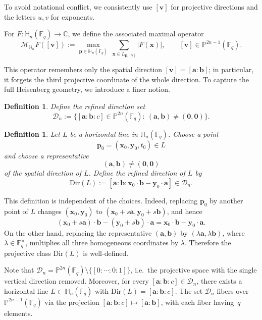 \documentclass[11pt]{article}
\newtheorem{definition}[theorem]{Definition}
\newcommand{\1}{\mathbf 1}
\begin{document}
To avoid notational conflict, we consistently use $[\mathbf{v}]$ for projective directions and the letters
$u,v$ for exponents.

\smallskip

For $F:\mathbb{H}_n(\mathbb{F}_q)\to\mathbb{C}$, we define the associated maximal operator
\[
\mathcal{M}_{\mathbb{H}_n}F([\mathbf{v}])
:=
\max_{\mathbf{p}\in\mathbb{H}_n(\mathbb{F}_q)}\ \sum_{\mathbf x\in L_{\mathbf{p}, [\mathbf{v}]}} |F(\mathbf x)|,
\qquad
[\mathbf{v}]\in \mathbb{P}^{2n-1}(\mathbb{F}_q).
\]

This operator remembers only the spatial direction $[\mathbf{v}]=[\mathbf{a}:\mathbf{b}]$; in particular, it forgets the third projective coordinate of the whole direction. To capture the full Heisenberg geometry, we introduce a finer notion.



{ 
\begin{definition}\label{def:refined-dir-set}
Define the refined direction set
\[
\mathcal D_n
:=
\bigl\{[\mathbf a:\mathbf b:c]\in\mathbb P^{2n}(\mathbb F_q):\ (\mathbf a,\mathbf b)\neq(\mathbf 0,\mathbf 0)\bigr\}.
\]
\end{definition}

\begin{definition}\label{def:refined-direction}
Let \(L\) be a horizontal line in \(\mathbb H_n(\mathbb F_q)\). Choose a point
\[
\mathbf p_0=(\mathbf x_0,\mathbf y_0,t_0)\in L
\]
and choose a representative
\[
(\mathbf a,\mathbf b)\neq(\mathbf 0,\mathbf 0)
\]
of the spatial direction of \(L\). Define the refined direction of \(L\) by
\[
\mathrm{Dir}(L)
:=
[\mathbf a:\mathbf b:\mathbf x_0\cdot\mathbf b-\mathbf y_0\cdot\mathbf a]
\in \mathcal D_n.
\]
\end{definition}
This definition is independent of the choices. Indeed, replacing \(\mathbf p_0\) by another point of \(L\) changes
\((\mathbf x_0,\mathbf y_0)\) to \((\mathbf x_0+s\mathbf a,\mathbf y_0+s\mathbf b)\), and hence
\[
(\mathbf x_0+s\mathbf a)\cdot\mathbf b-(\mathbf y_0+s\mathbf b)\cdot\mathbf a
=
\mathbf x_0\cdot\mathbf b-\mathbf y_0\cdot\mathbf a.
\]
On the other hand, replacing the representative \((\mathbf a,\mathbf b)\) by \((\lambda\mathbf a,\lambda\mathbf b)\), where \(\lambda\in\mathbb F_q^\times\), multiplies all three homogeneous coordinates by \(\lambda\). Therefore the projective class \(\mathrm{Dir}(L)\) is well-defined.
}

Note that \(\mathcal D_n=\mathbb P^{2n}(\mathbb F_q)\setminus\{[0:\cdots:0:1]\}\), i.e.\ the projective space with the single vertical direction removed.
Moreover, for every \([\mathbf a:\mathbf b:c]\in\mathcal D_n\), there exists a horizontal line \(L\subset \mathbb H_n(\mathbb F_q)\) with
\(\mathrm{Dir}(L)=[\mathbf a:\mathbf b:c]\). The set $\mathcal{D}_n$ fibers over $\mathbb{P}^{2n-1}(\mathbb{F}_q)$ via the
projection $[\mathbf{a}:\mathbf{b}:c]\mapsto[\mathbf{a}:\mathbf{b}]$,
with each fiber having~$q$ elements.
\end{document}
